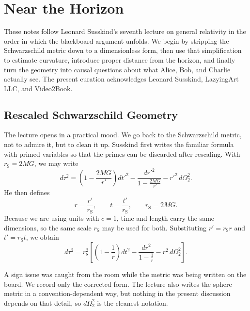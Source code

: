 \chapter{Near the Horizon}

These notes follow Leonard Susskind's seventh lecture on general relativity in the order in which the blackboard argument unfolds. We begin by stripping the Schwarzschild metric down to a dimensionless form, then use that simplification to estimate curvature, introduce proper distance from the horizon, and finally turn the geometry into causal questions about what Alice, Bob, and Charlie actually see. The present curation acknowledges Leonard Susskind, LazyingArt LLC, and Video2Book.

\section{Rescaled Schwarzschild Geometry}

The lecture opens in a practical mood. We go back to the Schwarzschild metric, not to admire it, but to clean it up. Susskind first writes the familiar formula with primed variables so that the primes can be discarded after rescaling. With \(r_{\mathrm S}=2MG\), we may write
\begin{equation}
d\tau^2
=
\left(1-\frac{2MG}{r'}\right)dt'^2
-
\frac{dr'^2}{1-\frac{2MG}{r'}}
-
r'^2\,d\Omega_2^2.
\end{equation}
He then defines
\begin{equation}
r=\frac{r'}{r_{\mathrm S}},
\qquad
t=\frac{t'}{r_{\mathrm S}},
\qquad
r_{\mathrm S}=2MG.
\end{equation}
Because we are using units with \(c=1\), time and length carry the same dimensions, so the same scale \(r_{\mathrm S}\) may be used for both. Substituting \(r'=r_{\mathrm S}r\) and \(t'=r_{\mathrm S}t\), we obtain
\begin{equation}
d\tau^2
=
r_{\mathrm S}^2
\left[
\left(1-\frac{1}{r}\right)dt^2
-
\frac{dr^2}{1-\frac{1}{r}}
-
r^2\,d\Omega_2^2
\right].
\end{equation}

\begin{remark}
A sign issue was caught from the room while the metric was being written on the board. We record only the corrected form. The lecture also writes the sphere metric in a convention-dependent way, but nothing in the present discussion depends on that detail, so \(d\Omega_2^2\) is the cleanest notation.
\end{remark}

